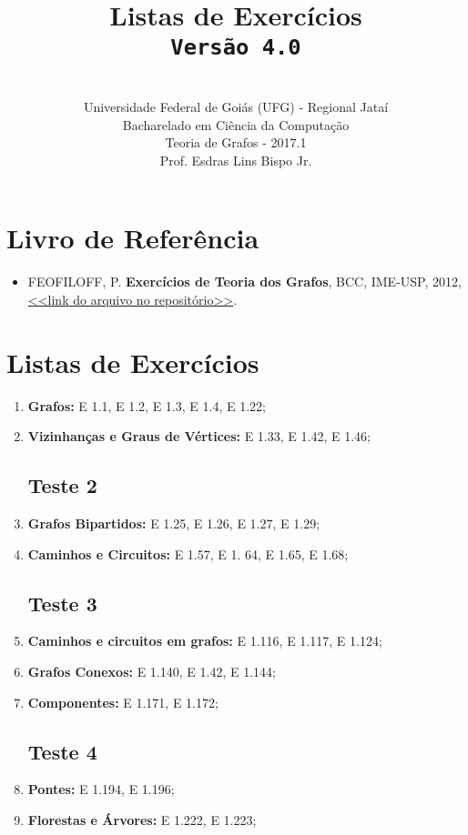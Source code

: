 \documentclass[12pt,a4paper,oneside]{article}
\author{\\Universidade Federal de Goiás (UFG) - Regional Jataí\\Bacharelado em Ciência da Computação \\Teoria de Grafos - 2017.1 \\Prof. Esdras Lins Bispo Jr.}
\date{}
\title{
	\sc \huge Listas de Exercícios 
	\\{\tt Versão 4.0}
}
\begin{document}
\maketitle

\section{Livro de Referência}
	\begin{itemize}
		\item FEOFILOFF, P. {\bf Exercícios de Teoria dos Grafos}, BCC, IME-USP, 2012, \href{https://github.com/bispojr/grafos/raw/master/2017.1/arquivos/exercicios-grafos.pdf}{<<link do arquivo no repositório>>}.
	\end{itemize}
	
\section{Listas de Exercícios}

\begin{enumerate}

	\subsection{Teste 1}
	\item[] {\bf Grafos:} E 1.1, E 1.2, E 1.3, E 1.4, E 1.22;
	\item[] {\bf Vizinhanças e Graus de Vértices:} E 1.33, E 1.42, E 1.46;
	\subsection{Teste 2}
	\item[] {\bf Grafos Bipartidos:} E 1.25, E 1.26, E 1.27, E 1.29;
	\item[] {\bf Caminhos e Circuitos:} E 1.57,	E 1. 64, E 1.65,	E 1.68;
	\subsection{Teste 3}
	\item[] {\bf Caminhos e circuitos em grafos:} E 1.116,	E 1.117, E 1.124;
	\item[] {\bf Grafos Conexos:} E 1.140, E 1.42, E 1.144;
	\item[] {\bf Componentes:} E 1.171, E 1.172;
	
	\subsection{Teste 4}
	\item[] {\bf Pontes:} E 1.194, E 1.196;
	\item[] {\bf Florestas e Árvores:} E 1.222, E 1.223;

\end{enumerate}
\end{document}
